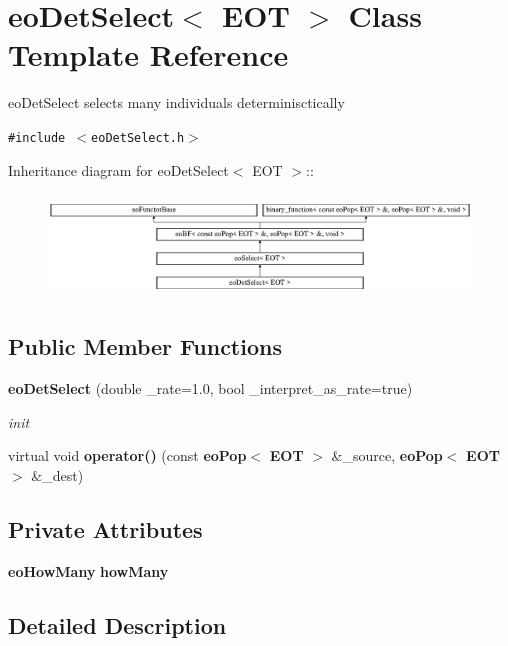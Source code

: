 \section{eo\-Det\-Select$<$ EOT $>$ Class Template Reference}
\label{classeo_det_select}
eo\-Det\-Select selects many individuals determinisctically  


{\tt \#include $<$eo\-Det\-Select.h$>$}

Inheritance diagram for eo\-Det\-Select$<$ EOT $>$::\begin{figure}[H]
\begin{center}
\leavevmode
\includegraphics[height=2.75184cm]{classeo_det_select}
\end{center}
\end{figure}
\subsection*{Public Member Functions}
\begin{CompactItemize}
\item 
{\bf eo\-Det\-Select} (double \_\-rate=1.0, bool \_\-interpret\_\-as\_\-rate=true)\label{classeo_det_select_a0}

\begin{CompactList}\small\item\em init \item\end{CompactList}\item 
virtual void {\bf operator()} (const {\bf eo\-Pop}$<$ {\bf EOT} $>$ \&\_\-source, {\bf eo\-Pop}$<$ {\bf EOT} $>$ \&\_\-dest)
\end{CompactItemize}
\subsection*{Private Attributes}
\begin{CompactItemize}
\item 
{\bf eo\-How\-Many} {\bf how\-Many}\label{classeo_det_select_r0}

\end{CompactItemize}


\subsection{Detailed Description}
